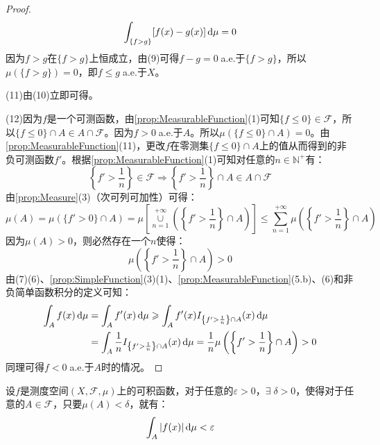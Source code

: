 \begin{proof}
\begin{equation*}
		\int_{\{f>g\}}[f(x)-g(x)]\mathop{}\!\mathrm{d}\mu=0
	\end{equation*}
	因为$f>g$在$\{f>g\}$上恒成立，由(9)可得$f-g=0\;$a.e.于$\{f>g\}$，所以$\mu(\{f>g\})=0$，即$f\leqslant g\;$a.e.于$X$。\par
	(11)由(10)立即可得。\par
	(12)因为$f$是一个可测函数，由\cref{prop:MeasurableFunction}(1)可知$\{f\leqslant0\}\in\mathscr{F}$，所以$\{f\leqslant0\}\cap A\in A\cap\mathscr{F}$。因为$f>0\;$a.e.于$A$。所以$\mu(\{f\leqslant0\}\cap A)=0$。由\cref{prop:MeasurableFunction}(11)，更改$f$在零测集$\{f\leqslant0\}\cap A$上的值从而得到的非负可测函数$f'$。根据\cref{prop:MeasurableFunction}(1)可知对任意的$n\in\mathbb{N}^+$有：
	\begin{equation*}
		\left\{f'>\frac{1}{n}\right\}\in\mathscr{F}\Rightarrow\left\{f'>\frac{1}{n}\right\}\cap A\in A\cap\mathscr{F}
	\end{equation*}
	由\cref{prop:Measure}(3)（次可列可加性）可得：
	\begin{equation*}
		\mu(A)=\mu(\{f'>0\}\cap A)=\mu\left[\underset{n=1}{\overset{+\infty}{\cup}}\left(\left\{f'>\frac{1}{n}\right\}\cap A\right)\right]\leqslant\sum_{n=1}^{+\infty}\mu\left(\left\{f'>\frac{1}{n}\right\}\cap A\right)
	\end{equation*}
	因为$\mu(A)>0$，则必然存在一个$n$使得：
	\begin{equation*}
		\mu\left(\left\{f'>\frac{1}{n}\right\}\cap A\right)>0
	\end{equation*}
	由(7)(6)、\cref{prop:SimpleFunction}(3)(1)、\cref{prop:MeasurableFunction}(5.b)、(6)和非负简单函数积分的定义可知：
	\begin{align*}
		\int_{A}f(x)\mathop{}\!\mathrm{d}\mu&=\int_{A}f'(x)\mathop{}\!\mathrm{d}\mu\geqslant\int_{A}f'(x)I_{\left\{f'>\frac{1}{n}\right\}\cap A}(x)\mathop{}\!\mathrm{d}\mu \\
		&=\int_{A}\frac{1}{n}I_{\left\{f'>\frac{1}{n}\right\}\cap A}(x)\mathop{}\!\mathrm{d}\mu=\frac{1}{n}\mu\left(\left\{f'>\frac{1}{n}\right\}\cap A\right)>0
	\end{align*}
	同理可得$f<0\;$a.e.于$A$时的情况。
\end{proof}
\begin{theorem}[积分的绝对连续性]
	设$f$是测度空间$(X,\mathscr{F},\mu)$上的可积函数，对于任意的$\varepsilon>0$，$\exists\;\delta>0$，使得对于任意的$A\in\mathscr{F}$，只要$\mu(A)<\delta$，就有：
	\begin{equation*}
		\int_{A}|f(x)|\mathop{}\!\mathrm{d}\mu<\varepsilon
	\end{equation*}
\end{theorem}
